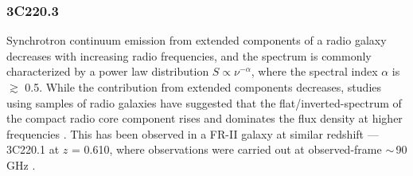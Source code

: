 \documentclass[twocolumn,apj,numberedappendix]{emulateapj}
\begin{document}
\subsubsection{3C220.3}\label{sec:SEDFg}
Synchrotron continuum emission from extended components of a radio galaxy decreases with increasing radio frequencies, 
and the spectrum is commonly characterized by a power law distribution $S \propto \nu^{-\alpha}$, where the 
spectral index $\alpha$ is $\gtrsim$ 0.5. While the contribution from extended components decreases, studies using 
samples of radio galaxies have suggested that the flat/inverted-spectrum of the compact radio core component rises 
and dominates the flux density at higher frequencies \citep{Kellermann81a,Begelman84a}. This has been observed in a FR-II galaxy at similar redshift --- 3C220.1 at $z$ = 0.610, where observations were carried out at observed-frame $\sim$\,90 GHz \citep{Hardcastle08a}. 
\end{document}
